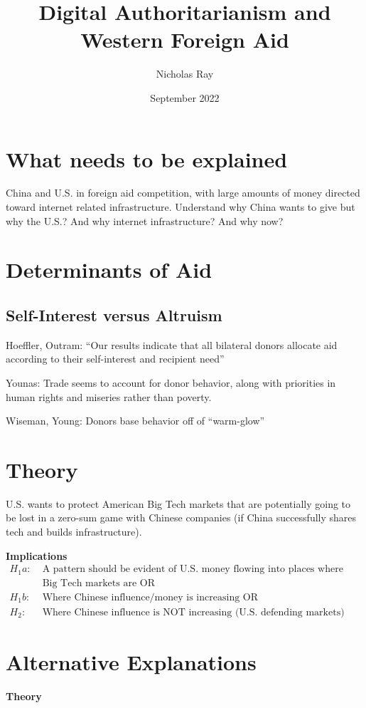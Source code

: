 \documentclass{article}
\title{Digital Authoritarianism and Western Foreign Aid}
\author{Nicholas Ray}
\date{September 2022}
\begin{document}
\maketitle
\section*{What needs to be explained}
China and U.S. in foreign aid competition, with large amounts of money directed toward internet related infrastructure.
Understand why China wants to give but why the U.S.? And why internet infrastructure? And why now?

\section*{Determinants of Aid}
\subsection*{Self-Interest versus Altruism}
Hoeffler, Outram: ``Our results indicate that all bilateral donors allocate aid according to their self-interest and recipient need''

Younas: Trade seems to account for donor behavior, along with priorities in human rights and miseries rather than poverty.

Wiseman, Young: Donors base behavior off of ``warm-glow''

\section*{Theory} 
U.S. wants to protect American Big Tech markets that are potentially going to be lost in a zero-sum game with Chinese companies (if China successfully shares tech and builds infrastructure).

\textbf{Implications} 
\begin{align*}
    H_1a:\; & \text{A pattern should be evident of U.S. money flowing into places where either}\\
    & \text{Big Tech markets are OR}\\
    H_1b:\; & \text{Where Chinese influence/money is increasing OR}\\
    H_2:\; & \text{Where Chinese influence is NOT increasing (U.S. defending markets)}
\end{align*}

\section*{Alternative Explanations}
\textbf{Theory}
\end{document}
